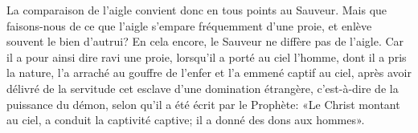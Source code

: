 La comparaison de l’aigle convient donc en tous points au Sauveur.
Mais que faisons-nous de ce que l’aigle s’empare fréquemment d’une proie,
	et enlève souvent le bien d’autrui?
	En cela encore, le Sauveur ne diffère pas de l’aigle.
Car il a pour ainsi dire ravi une proie,
	lorsqu’il a porté au ciel l’homme, dont il a pris la nature,
	l’a arraché au gouffre de l’enfer et l’a emmené captif au ciel,
	après avoir délivré de la servitude cet esclave d’une domination étrangère,
	c’est-à-dire de la puissance du démon,
	selon qu’il a été écrit par le Prophète:
	«Le Christ montant au ciel, a conduit la captivité captive;
	il a donné des dons aux hommes».
